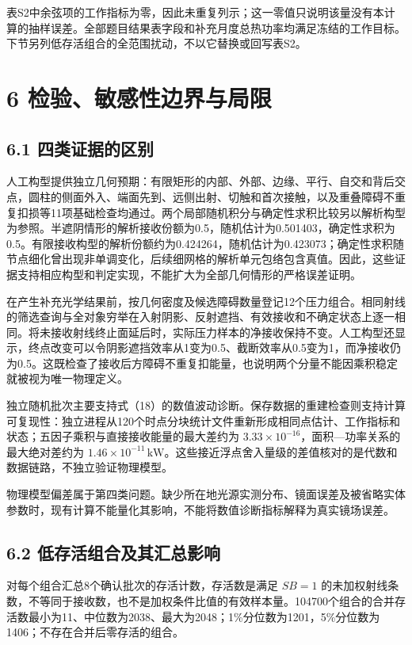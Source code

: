 \documentclass[UTF8,fontset=windows,zihao=-4]{ctexart}
\begin{document}
表S2中余弦项的工作指标为零，因此未重复列示；这一零值只说明该量没有本计算的抽样误差。全部题目结果表字段和补充月度总热功率均满足冻结的工作目标。下节另列低存活组合的全范围扰动，不以它替换或回写表S2。

\section*{6 检验、敏感性边界与局限}

\subsection*{6.1 四类证据的区别}

人工构型提供独立几何预期：有限矩形的内部、外部、边缘、平行、自交和背后交点，圆柱的侧面外入、端面先到、远侧出射、切触和首次接触，以及重叠障碍不重复扣损等11项基础检查均通过。两个局部随机积分与确定性求积比较另以解析构型为参照。半遮阴情形的解析接收份额为0.5，随机估计为0.501403，确定性求积为0.5。有限接收构型的解析份额约为0.424264，随机估计为0.423073；确定性求积随节点细化曾出现非单调变化，后续细网格的解析单元包络包含真值。因此，这些证据支持相应构型和判定实现，不能扩大为全部几何情形的严格误差证明。

在产生补充光学结果前，按几何密度及候选障碍数量登记12个压力组合。相同射线的筛选查询与全对象穷举在入射阴影、反射遮挡、有效接收和不确定状态上逐一相同。将未接收射线终止面延后时，实际压力样本的净接收保持不变。人工构型还显示，终点改变可以令阴影遮挡效率从1变为0.5、截断效率从0.5变为1，而净接收仍为0.5。这既检查了接收后方障碍不重复扣能量，也说明两个分量不能因乘积稳定就被视为唯一物理定义。

独立随机批次主要支持式（18）的数值波动诊断。保存数据的重建检查则支持计算可复现性：独立进程从120个时点分块统计文件重新形成相同点估计、工作指标和状态；五因子乘积与直接接收能量的最大差约为 \(3.33\times10^{-16}\)，面积—功率关系的最大绝对差约为 \(1.46\times10^{-11}\,\mathrm{kW}\)。这些接近浮点舍入量级的差值核对的是代数和数据链路，不独立验证物理模型。

物理模型偏差属于第四类问题。缺少所在地光源实测分布、镜面误差及被省略实体参数时，现有计算不能量化其影响，不能将数值诊断指标解释为真实镜场误差。

\subsection*{6.2 低存活组合及其汇总影响}

对每个组合汇总8个确认批次的存活计数，存活数是满足 \(SB=1\) 的未加权射线条数，不等同于接收数，也不是加权条件比值的有效样本量。104700个组合的合并存活数最小为11、中位数为2038、最大为2048；1\%分位数为1201，5\%分位数为1406；不存在合并后零存活的组合。
\end{document}
